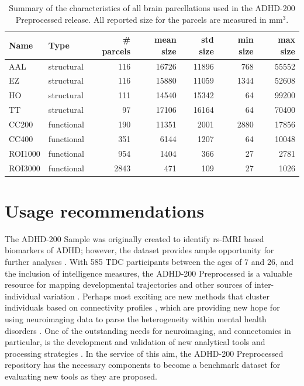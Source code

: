 \documentclass[preprint,12pt,3p]{elsarticle}
\begin{document}
\begin{table}[htbp]
\label{tab_parcellations}
\caption{Summary of the characteristics of all brain parcellations used in the ADHD-200 Preprocessed release. All reported size for the parcels are measured in mm$^3$.}
\begin{tabular}{llrrrrr}
Name & Type & \# parcels & mean size & std size & min size & max size \\
\hline
AAL	    & structural &  116 &  16726 & 11896 &  768 & 55552\\
EZ	    & structural &  116 &  15880 & 11059 & 1344 & 52608\\
HO	    & structural &  111 &  14540 & 15342 &   64 & 99200\\
TT	    & structural & 	 97 &  17106 & 16164 &   64 & 70400\\
CC200   & functional &  190 &  11351 &  2001 & 2880 & 17856\\
CC400   & functional &  351 &   6144 &  1207 &   64 & 10048\\
ROI1000 & functional &  954 &   1404 &   366 &   27 & 2781\\
ROI3000	& functional & 2843	&    471 &   109 &   27 & 1026\\
\end{tabular}
\end{table}

%

\section{Usage recommendations}

The ADHD-200 Sample was originally created to identify rs-fMRI based biomarkers of ADHD; however, the dataset provides ample opportunity for further analyses \cite{craddock2015}. With 585 TDC participants between the ages of 7 and 26, and the inclusion of intelligence measures, the ADHD-200 Preprocessed is a valuable resource for mapping developmental trajectories \cite{dosenbach2010, zuo2010, dimartino2014} and other sources of inter-individual variation \cite{kelly2012}. Perhaps most exciting are new methods that cluster individuals based on connectivity profiles \cite{miranda2014connectotyping, finn2015fingerprinting}, which are providing new hope for using neuroimaging data to parse the heterogeneity within mental health disorders \cite{castellanos2013}. One of the outstanding needs for neuroimaging, and connectomics in particular, is the development and validation of new analytical tools and processing strategies \cite{craddock2013,varoquaux2013,craddock2015}. In the service of this aim, the ADHD-200 Preprocessed repository has the necessary components to become a benchmark dataset for evaluating new tools as they are proposed.
\end{document}
